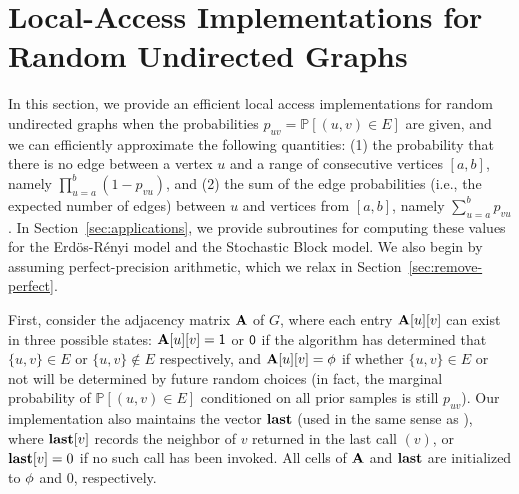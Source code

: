 \section{Local-Access Implementations for Random Undirected Graphs}
\label{sec:undirected}

In this section, we provide an efficient local access implementations for random undirected graphs
when the probabilities $p_{uv}=\mathbb P[(u,v)\in E]$ are given, and we can efficiently approximate the following quantities:
(1) the probability that there is no edge between a vertex $u$ and a range of consecutive vertices $[a,b]$, namely $\prod_{u=a}^b (1-p_{vu})$, and
(2) the sum of the edge probabilities (i.e., the expected number of edges) between $u$ and vertices from $[a,b]$, namely $\sum_{u=a}^b p_{vu}$.
In Section~\ref{sec:applications}, we provide subroutines for computing these values for the Erd\"{o}s-R\'{e}nyi model and the Stochastic Block model.
We also begin by assuming perfect-precision arithmetic, which we relax in Section~\ref{sec:remove-perfect}.

\iffalse
{\color{blue}
Alternatively, we provide an implementation for these two models with a deterministic performance guarantee in Section~\ref{sec:ER-det}.
In this setting, introducing the \func{Vertex-Pair} queries results in an amortized guarantee on the run-time.
The deterministic guarantee comes at the cost of more complicated data-structures
(we use a two-level nested interval tree and binary search tree).
}
\fi

First, consider the adjacency matrix $\mathbf{A}$ of $G$, where each entry $\mathbf{A}[u][v]$ can exist in three possible states:
$\mathbf{A}[u][v] = \mathsf{1}$ or $\mathsf{0}$ if the algorithm has determined that $\{u,v\}\in E$ or $\{u,v\} \notin E$ respectively,
and $\mathbf{A}[u][v] = \phi$ if whether $\{u,v\}\in E$ or not will be determined by future random choices
(in fact, the marginal probability of $\mathbb P[(u,v)\in E]$ conditioned on all prior samples is still $p_{uv}$).
Our implementation also maintains the vector $\mathbf{last}$ (used in the same sense as \cite{reut}),
where $\mathbf{last}[v]$ records the neighbor of $v$ returned in the last call $(v)$, or $\mathbf{last}[v]=0$ if no such call has been invoked.
All cells of $\mathbf{A}$ and $\mathbf{last}$ are initialized to $\phi$ and $0$, respectively.

